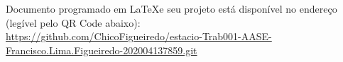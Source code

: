 
%
\begin{anexosenv}

\partanexos

Documento programado em \LaTeX  e seu projeto está disponível no endereço (legível pelo QR Code abaixo): \\ \href{https://github.com/ChicoFigueiredo/estacio-Trab001-AASE-Francisco.Lima.Figueiredo-202004137859.git}{ https://github.com/ChicoFigueiredo/estacio-Trab001-AASE-Francisco.Lima.Figueiredo-202004137859.git }\\


\end{anexosenv}
